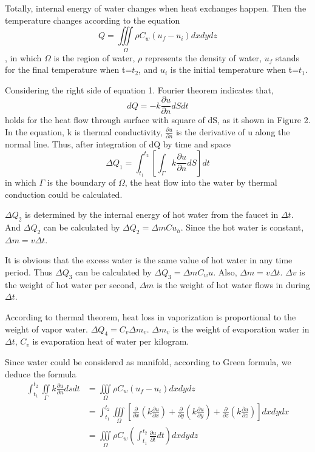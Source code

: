\documentclass[12pt,a4paper,titlepage]{article}
\begin{document}
Totally, internal energy of water changes when heat exchanges happen.
Then the temperature changes according to the equation
\begin{equation}
 Q=\iiint\limits_{\Omega}\rho C_{w}(u_f - u_i)dx dy dz
\end{equation}
, in which $\Omega$ is the region of water, $\rho$ represents the density of water, $u_f$ stands for the final temperature when t=$t_2$, and $u_i$ is the initial temperature when t=$t_1$.

Considering the right side of equation 1.
Fourier theorem indicates that,
\begin{equation}
 dQ=-k\frac{\partial u}{\partial n}dSdt
\end{equation}
holds for the heat flow through surface with square of dS, as it shown in Figure 2.
In the equation, k is thermal conductivity, $\frac{\partial u}{\partial n}$ is the derivative of u along the normal line. Thus, after integration of dQ by time and space
\begin{equation}
 \Delta Q_1=\int_{t_1}^{t_2}[{\int_{\Gamma}}k\frac{\partial u}{\partial n}dS]dt
\end{equation}
in which $\Gamma$ is the boundary of $\Omega$,
the heat flow into the water by thermal conduction could be calculated.

$\Delta Q_2$ is determined by the internal energy of hot water from the faucet in $\Delta t$.
And $\Delta Q_2$ can be calculated by
$\Delta Q_2={\Delta m}C{u_h}$.
Since the hot water is constant,
$\Delta m=v{\Delta t}$.

It is obvious that the excess water is the same value of hot water in any time period.
Thus $\Delta Q_3$ can be calculated by
$\Delta Q_3={\Delta m}{C_w}u$.
Also, $\Delta m=v{\Delta t}$.
$\Delta v$ is the weight of hot water per second, $\Delta m$ is the weight of hot water flows in during $\Delta t$.

According to thermal theorem, heat loss in vaporization is proportional to the weight of vapor water.
$\Delta Q_4={C_v}\Delta {m_v}$.
$\Delta {m_v}$ is the weight of evaporation water in $\Delta t$, ${C_v}$ is evaporation heat of water per kilogram.

Since water could be considered as manifold, according to Green formula, we deduce the formula
\begin{displaymath}
\begin{aligned}
\int_{t_1}^{t_2} \iint\limits_{\Gamma}k\frac{\partial u}{\partial n}dsdt & =\iiint\limits_{\Omega}\rho C_{w}(u_f - u_i)dx dy dz\\
& =\int_{t_1}^{t_2}\iiint\limits_{\Omega}[\frac{\partial}{\partial x}(k\frac{\partial u}{\partial x})+\frac{\partial}{\partial y}(k\frac{\partial u}{\partial y})+\frac{\partial}{\partial z}(k\frac{\partial u}{\partial z})]dxdydx\\
& = \iiint\limits_{\Omega}\rho C_{w}(\int_{t_1}^{t_2}\frac{\partial u}{\partial t}dt)dxdydz
\end{aligned}
\end{displaymath}
\end{document}

